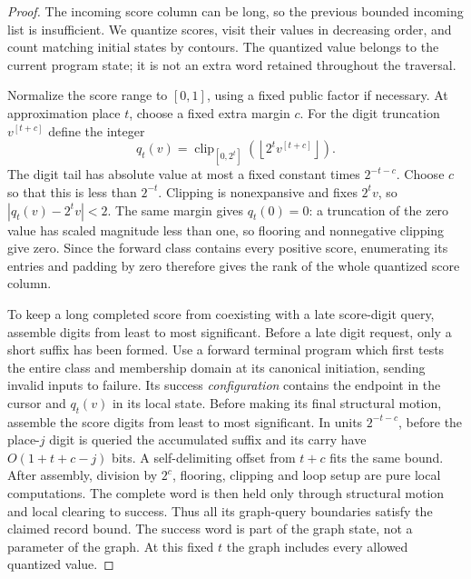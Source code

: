 \begin{proof}
The incoming score column can be long, so the previous bounded incoming list is insufficient. We quantize scores, visit their values in decreasing order, and count matching initial states by contours. The quantized value belongs to the current program state; it is not an extra word retained throughout the traversal.

Normalize the score range to $[0,1]$, using a fixed public factor if
necessary.  At approximation place $t$, choose a fixed extra margin $c$.
For the digit truncation $v^{[t+c]}$ define the integer
\begin{equation}\label{eq:ctrl-score-quantization}
 q_t(v)=\operatorname{clip}_{[0,2^t]}
             \left(\left\lfloor 2^t v^{[t+c]}\right\rfloor\right).
\end{equation}
The digit tail has absolute value at most a fixed constant times
$2^{-t-c}$.  Choose $c$ so that this is less than $2^{-t}$.
Clipping is nonexpansive and fixes $2^t v$, so
$|q_t(v)-2^t v|<2$.  The same margin gives $q_t(0)=0$:
a truncation of the zero value has scaled magnitude less than one, so
flooring and nonnegative clipping give zero.  Since the forward class
contains every positive score, enumerating its entries and padding by
zero therefore gives the rank of the whole quantized score column.

To keep a long completed score from coexisting with a late score-digit query, assemble digits from least to most significant. Before a late digit request, only a short suffix has been formed. Use a forward terminal program which first tests the entire class and
membership domain at its canonical initiation, sending invalid inputs
to failure.  Its success \emph{configuration} contains the endpoint in
the cursor and $q_t(v)$ in its local state.  Before making its final
structural motion, assemble the score digits from least to most
significant.  In units $2^{-t-c}$, before the place-$j$ digit is queried
the accumulated suffix and its carry have $O(1+t+c-j)$ bits.  A
self-delimiting offset from $t+c$ fits the same bound.  After assembly,
division by $2^c$, flooring, clipping and loop setup are pure local computations.  The
complete word is then held only through structural motion and local
clearing to success.  Thus all its graph-query boundaries satisfy the
claimed record bound.  The success word is part of the graph state, not
a parameter of the graph.  At this fixed $t$ the graph includes every
allowed quantized value.


\end{proof}
